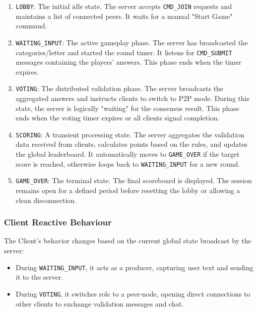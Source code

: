 \documentclass{scrartcl}
\begin{document}
\begin{enumerate}
    \item \texttt{LOBBY}: 
    The initial idle state. 
    The server accepts \texttt{CMD\_JOIN} requests and maintains a list of connected peers. 
    It waits for a manual "Start Game" command.
    
    \item \texttt{WAITING\_INPUT}: 
    The active gameplay phase. 
    The server has broadcasted the categories/letter and started the round timer. 
    It listens for \texttt{CMD\_SUBMIT} messages containing the players' answers. 
    This phase ends when the timer expires.
    
    \item \texttt{VOTING}: 
    The distributed validation phase. 
    The server broadcasts the aggregated answers and instructs clients to switch to P2P mode. 
    During this state, the server is logically "waiting" for the consensus result.
    This phase ends when the voting timer expires or all clients signal completion.
    
    \item \texttt{SCORING}: 
    A transient processing state. The server aggregates the validation data received from clients, calculates points based on the rules, and updates the global leaderboard.
    It automatically moves to \texttt{GAME\_OVER} if the target score is reached, 
    otherwise loops back to \texttt{WAITING\_INPUT} for a new round.
    
    \item \texttt{GAME\_OVER}: 
    The terminal state. 
    The final scoreboard is displayed.
    The session remains open for a defined period before resetting the lobby or allowing a clean disconnection.
\end{enumerate}

\subsubsection*{Client Reactive Behaviour}
The Client's behavior changes based on the current global state broadcast by the server:
\begin{itemize}
    \item During \texttt{WAITING\_INPUT}, it acts as a producer, capturing user text and sending it to the server.
    \item During \texttt{VOTING}, it switches role to a peer-node, opening direct connections to other clients to exchange validation messages and chat.
\end{itemize}
\end{document}
